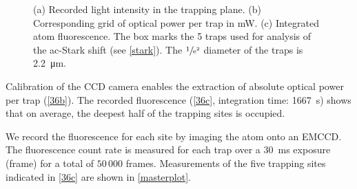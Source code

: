 \documentclass[../Thesis-IJspeert.tex]{subfiles}
\begin{document}
\begin{figure}[t]
\begin{subfigure}[b]{.32\linewidth}
		\centering
		\caption{}
		\label{36b}
	\end{subfigure}
	\begin{subfigure}[b]{.32\linewidth}
		\centering
		\caption{}
		\label{36c}
	\end{subfigure}
	\caption{(a) Recorded light intensity in the trapping plane. (b) Corresponding grid of optical power per trap in \si{\milli\watt}. (c) Integrated atom fluorescence. The box marks the 5 traps used for analysis of the ac-Stark shift (see \autoref{stark}). The $\sfrac{1}{\mathrm{e}^2}$ diameter of the traps is \SI{2.2}{\micro\meter}.}
	\label{mainstarkfigure}
\end{figure}
Calibration of the CCD camera enables the extraction of absolute optical power per trap (\autoref{36b}). The recorded fluorescence (\autoref{36c}, integration time: \SI{1667}{\second}) shows that on average, the deepest half of the trapping sites is occupied.


We record the fluorescence for each site by imaging the atom onto an EMCCD. The fluorescence count rate is measured for each trap over a \SI{30}{\milli\second} exposure (frame) for a total of $50\,000$ frames. Measurements of the five trapping sites indicated in \autoref{36c} are shown in \autoref{masterplot}.
\end{document}

